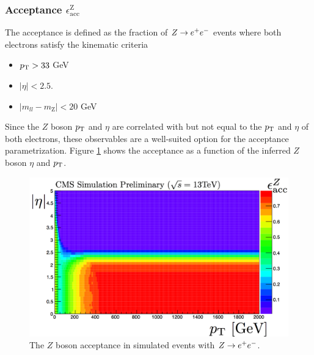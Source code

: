 \subsubsection{Acceptance $\epsilon^{\text{Z}}_{\text{acc}}$}
The acceptance is defined as the fraction of $Z\rightarrow e^+e^-$ events where both electrons satisfy the kinematic criteria
\begin{itemize}
\item $p_{\text{T}}>33$ GeV
\item $|\eta|<2.5$.
\item $|m_{ll}-m_{\text{Z}}|<20$ GeV
\end{itemize}
Since the $Z$ boson $p_{\text{T}}$ and $\eta$ are correlated with but not equal to the $p_{\text{T}}$ and $\eta$ of both electrons, these observables are a well-suited option for the acceptance parametrization. Figure \ref{fig:ZeeAcceptance} shows the acceptance as a function of the inferred $Z$ boson $\eta$ and $p_{\text{T}}$. 
\begin{figure}[tb!]
\centering
\includegraphics[width=0.7\linewidth]{figures/SusySearches/HadStop2015/ZeeAcceptance.png}
\caption{The $Z$ boson acceptance in simulated events with $Z\rightarrow e^+e^-$.}
\label{fig:ZeeAcceptance}
\end{figure}

